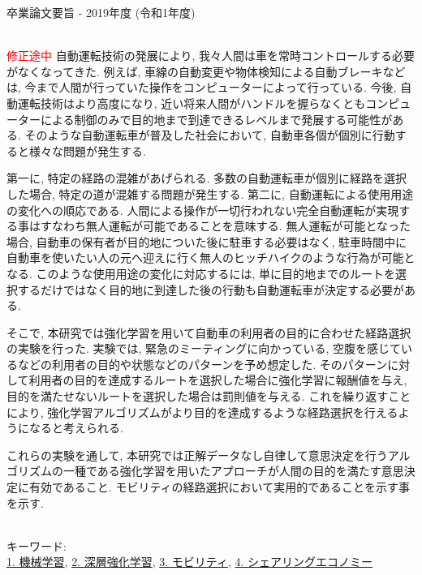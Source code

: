 卒業論文要旨 - 2019年度 (令和1年度)
\begin{center}
\begin{large}
\end{large}
\end{center}

~ \\

\textcolor{red}{修正途中}
自動運転技術の発展により, 我々人間は車を常時コントロールする必要がなくなってきた.
例えば, 車線の自動変更や物体検知による自動ブレーキなどは, 今まで人間が行っていた操作をコンピューターによって行っている.
今後, 自動運転技術はより高度になり, 近い将来人間がハンドルを握らなくともコンピューターによる制御のみで目的地まで到達できるレベルまで発展する可能性がある.
そのような自動運転車が普及した社会において, 自動車各個が個別に行動すると様々な問題が発生する.

第一に, 特定の経路の混雑があげられる.
多数の自動運転車が個別に経路を選択した場合, 特定の道が混雑する問題が発生する.
第二に, 自動運転による使用用途の変化への順応である. 人間による操作が一切行われない完全自動運転が実現する事はすなわち無人運転が可能であることを意味する.
無人運転が可能となった場合, 自動車の保有者が目的地についた後に駐車する必要はなく, 駐車時間中に自動車を使いたい人の元へ迎えに行く無人のヒッチハイクのような行為が可能となる.
このような使用用途の変化に対応するには, 単に目的地までのルートを選択するだけではなく目的地に到達した後の行動も自動運転車が決定する必要がある.

そこで, 本研究では強化学習を用いて自動車の利用者の目的に合わせた経路選択の実験を行った.
実験では, 緊急のミーティングに向かっている, 空腹を感じているなどの利用者の目的や状態などのパターンを予め想定した. そのパターンに対して利用者の目的を達成するルートを選択した場合に強化学習に報酬値を与え, 目的を満たせないルートを選択した場合は罰則値を与える.
これを繰り返すことにより, 強化学習アルゴリズムがより目的を達成するような経路選択を行えるようになると考えられる.

これらの実験を通して, 本研究では正解データなし自律して意思決定を行うアルゴリズムの一種である強化学習を用いたアプローチが人間の目的を満たす意思決定に有効であること. モビリティの経路選択において実用的であることを示す事を示す.

~ \\
キーワード:\\
\underline{1. 機械学習},
\underline{2. 深層強化学習},
\underline{3. モビリティ},
\underline{4. シェアリングエコノミー}
\begin{flushright}
\dept \\
\author
\end{flushright}
